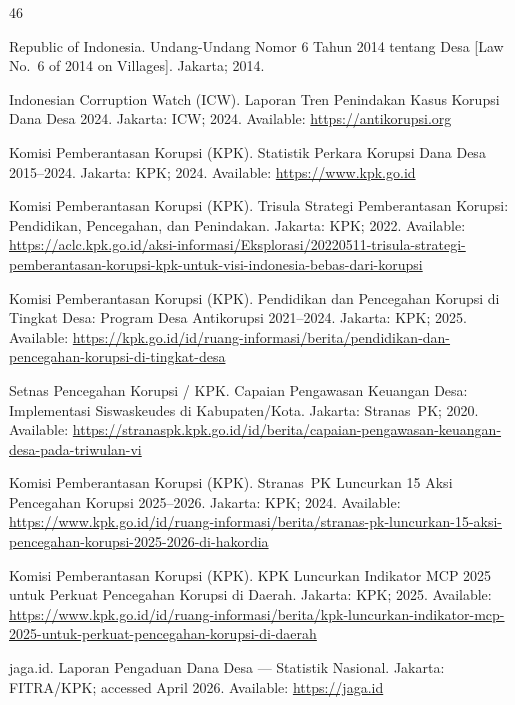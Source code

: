 \documentclass[3p,times,procedia]{elsarticle}
\begin{document}
\begin{thebibliography}{46}

Republic of Indonesia. Undang-Undang Nomor 6 Tahun 2014 tentang Desa [Law No.~6 of 2014 on Villages]. Jakarta; 2014.

Indonesian Corruption Watch (ICW). Laporan Tren Penindakan Kasus Korupsi Dana Desa 2024. Jakarta: ICW; 2024. Available: \url{https://antikorupsi.org}

Komisi Pemberantasan Korupsi (KPK). Statistik Perkara Korupsi Dana Desa 2015--2024. Jakarta: KPK; 2024. Available: \url{https://www.kpk.go.id}

Komisi Pemberantasan Korupsi (KPK). Trisula Strategi Pemberantasan Korupsi: Pendidikan, Pencegahan, dan Penindakan. Jakarta: KPK; 2022. Available: \url{https://aclc.kpk.go.id/aksi-informasi/Eksplorasi/20220511-trisula-strategi-pemberantasan-korupsi-kpk-untuk-visi-indonesia-bebas-dari-korupsi}

Komisi Pemberantasan Korupsi (KPK). Pendidikan dan Pencegahan Korupsi di Tingkat Desa: Program Desa Antikorupsi 2021--2024. Jakarta: KPK; 2025. Available: \url{https://kpk.go.id/id/ruang-informasi/berita/pendidikan-dan-pencegahan-korupsi-di-tingkat-desa}

Setnas Pencegahan Korupsi / KPK. Capaian Pengawasan Keuangan Desa: Implementasi Siswaskeudes di Kabupaten/Kota. Jakarta: Stranas~PK; 2020. Available: \url{https://stranaspk.kpk.go.id/id/berita/capaian-pengawasan-keuangan-desa-pada-triwulan-vi}

Komisi Pemberantasan Korupsi (KPK). Stranas~PK Luncurkan 15 Aksi Pencegahan Korupsi 2025--2026. Jakarta: KPK; 2024. Available: \url{https://www.kpk.go.id/id/ruang-informasi/berita/stranas-pk-luncurkan-15-aksi-pencegahan-korupsi-2025-2026-di-hakordia}

Komisi Pemberantasan Korupsi (KPK). KPK Luncurkan Indikator MCP 2025 untuk Perkuat Pencegahan Korupsi di Daerah. Jakarta: KPK; 2025. Available: \url{https://www.kpk.go.id/id/ruang-informasi/berita/kpk-luncurkan-indikator-mcp-2025-untuk-perkuat-pencegahan-korupsi-di-daerah}

jaga.id. Laporan Pengaduan Dana Desa --- Statistik Nasional. Jakarta: FITRA/KPK; accessed April 2026. Available: \url{https://jaga.id}


\end{thebibliography}
\end{document}
